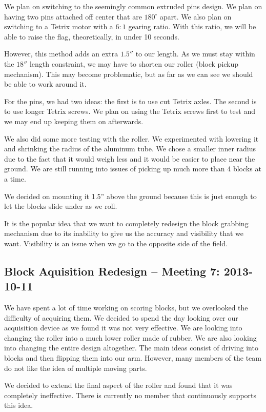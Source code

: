 We plan on switching to the seemingly common extruded pins design. We plan on having two pins attached off center that are $180^\circ$ apart. We also plan on switching to a Tetrix motor with a $6:1$ gearing ratio. With this ratio, we will be able to raise the flag, theoretically, in under 10 seconds. 

However, this method adds an extra $1.5''$ to our length. As we must stay within the $18''$ length constraint, we may have to shorten our roller (block pickup mechanism). This may become problematic, but as far as we can see we should be able to work around it. 

For the pins, we had two ideas: the first is to use cut Tetrix axles. The second is to use longer Tetrix screws. We plan on using the Tetrix screws first to test and we may end up keeping them on afterwards. 

We also did some more testing with the roller. We experimented with lowering it and shrinking the radius of the aluminum tube. We chose a smaller inner radius due to the fact that it would weigh less and it would be easier to place near the ground. We are still running into issues of picking up much more than 4 blocks at a time. 

We decided on mounting it 1.5'' above the ground because this is just enough to let the blocks slide under as we roll. 

It is the popular idea that we want to completely redesign the block grabbing mechanism due to its inability to give us the accuracy and visibility that we want. Visibility is an issue when we go to the opposite side of the field. 

\newpage \subsection{Block Aquisition Redesign -- Meeting 7: 2013-10-11}
We have spent a lot of time working on scoring blocks, but we overlooked the difficulty of acquiring them. We decided to spend the day looking over our acquisition device as we found it was not very effective. We are looking into changing the roller into a much lower roller made of rubber. We are also looking into changing the entire design altogether. The main ideas consist of driving into blocks and then flipping them into our arm. However, many members of the team do not like the idea of multiple moving parts. 

We decided to extend the final aspect of the roller and found that it was completely ineffective. There is currently no member that continuously supports this idea. 


